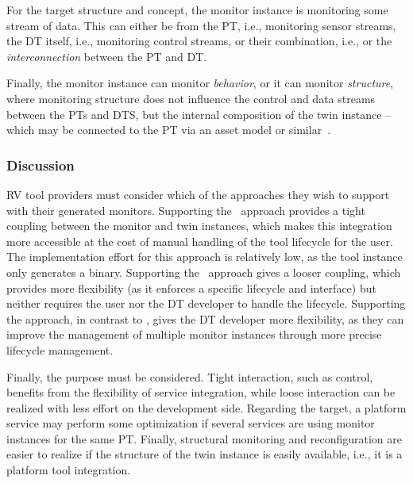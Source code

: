 For the target structure and concept, the monitor instance is monitoring some stream of data. This can either be from the PT, i.e., monitoring sensor streams, the DT itself, i.e., monitoring control streams, or their combination, i.e., or the \emph{interconnection} between the PT and DT.

Finally, the monitor instance can monitor \emph{behavior}, or it can monitor \emph{structure}, where monitoring structure does not influence the control and data streams between the PTs and DTS, but the internal composition of the twin instance -- which may be connected to the PT via an asset model or similar~\cite{DBLP:conf/isola/KamburjanKSTCJ22}.


\subsubsection{Discussion}
RV tool providers must consider which of the approaches they wish to support with their generated monitors.
Supporting the \methodone\ approach provides a tight coupling between the monitor and twin instances, which makes this integration more accessible at the cost of manual handling of the tool lifecycle for the user.
The implementation effort for this approach is relatively low, as the tool instance only generates a binary.
Supporting the \methodtwo\ approach gives a looser coupling, which provides more flexibility (as it enforces a specific lifecycle and interface) but neither requires the user nor the DT developer to handle the lifecycle.
Supporting the \methodthree approach, in contrast to \methodtwo, gives the DT developer more flexibility, as they can improve the management of multiple monitor instances through more precise lifecycle management.

Finally, the purpose must be considered. Tight interaction, such as control, benefits from the flexibility of service integration, while loose interaction can be realized with less effort on the development side. Regarding the target, a platform service may perform some optimization if several services are using monitor instances for the same PT. Finally, structural monitoring and reconfiguration are easier to realize if the structure of the twin instance is easily available, i.e., it is a platform tool integration.



